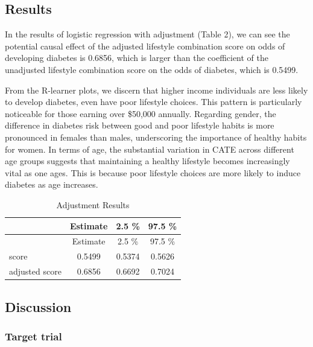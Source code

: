 \documentclass[
  12pt,
]{article}
\begin{document}
\hypertarget{results}{%
\subsection{Results}\label{results}}

In the results of logistic regression with adjustment (Table 2), we can
see the potential causal effect of the adjusted lifestyle combination
score on odds of developing diabetes is 0.6856, which is larger than the
coefficient of the unadjusted lifestyle combination score on the odds of
diabetes, which is 0.5499.

From the R-learner plots, we discern that higher income individuals are
less likely to develop diabetes, even have poor lifestyle choices. This
pattern is particularly noticeable for those earning over \$50,000
annually. Regarding gender, the difference in diabetes risk between good
and poor lifestyle habits is more pronounced in females than males,
underscoring the importance of healthy habits for women. In terms of
age, the substantial variation in CATE across different age groups
suggests that maintaining a healthy lifestyle becomes increasingly vital
as one ages. This is because poor lifestyle choices are more likely to
induce diabetes as age increases.

\begin{longtable}[]{@{}lccc@{}}
\caption{Adjustment Results}\tabularnewline
\toprule()
& Estimate & 2.5 \% & 97.5 \% \\
\midrule()
\endfirsthead
\toprule()
& Estimate & 2.5 \% & 97.5 \% \\
\midrule()
\endhead
score & 0.5499 & 0.5374 & 0.5626 \\
adjusted score & 0.6856 & 0.6692 & 0.7024 \\
\bottomrule()
\end{longtable}

\hypertarget{discussion}{%
\subsection{Discussion}\label{discussion}}

\hypertarget{target-trial}{%
\subsubsection{Target trial}\label{target-trial}}
\end{document}
